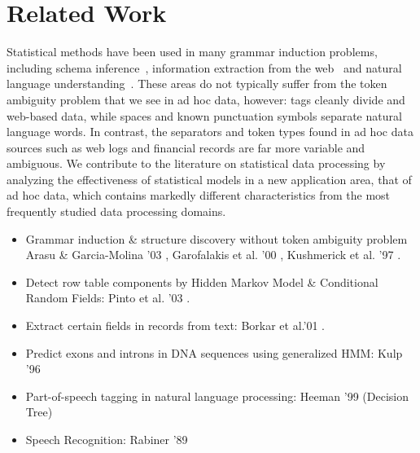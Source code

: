 \section{Related Work}\label{sec:related}
Statistical methods have been used in many grammar induction problems,
including
\xml{} schema inference~\cite{bex+:dtd-inference},
information extraction from the web~\cite{hong:thesis,arasu+:sigmod03long}
and
natural language understanding~\cite{Chen95bayesiangrammar}.
These areas do not typically suffer from the
token ambiguity problem that we see in ad hoc data, however:
tags cleanly divide
\xml{} and web-based data, while spaces and known punctuation symbols
separate natural language words.
In contrast,
the separators and token types found in ad hoc data sources such as
web logs and financial records are far more variable and
ambiguous.  We contribute to the literature on statistical
data processing by analyzing the effectiveness of statistical models
in a new application area, that of ad hoc data, which contains
markedly different characteristics from the most frequently studied
data processing domains.

\begin{itemize}
\item Grammar induction \& structure discovery without token ambiguity problem
Arasu \& Garcia-Molina '03 \cite{arasu+:sigmod03},
Garofalakis et al. '00 \cite{garofalakis+:xtract},
Kushmerick et al. '97 \cite{kushmerick-phd1997}.

\item Detect row table components by Hidden Markov Model \& Conditional Random Fields:
Pinto et al. '03 \cite{Pinto+:texttables}.

\item  Extract certain fields in records from text:
Borkar et al.'01 \cite{borkar+:text-segmentation}.

\item Predict exons and introns in DNA sequences using generalized HMM:
Kulp '96 \cite{kulp96generalized}

\item  Part-of-speech tagging in natural language processing:
Heeman '99 (Decision Tree) \cite{Heeman99:speech}

\item Speech Recognition: Rabiner '89 \cite{rabiner89:hmm}

\end{itemize}

